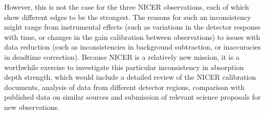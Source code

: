 		    However, this is not the case for the three NICER observations, each of which show different edges to be the strongest. The reasons for such an inconsistency might range from instrumental effects (such as variations in the detector response with time, or changes in the gain calibration between observations) to issues with data reduction (such as inconsistencies in background subtraction, or inaccuracies in deadtime correction). Because NICER is a relatively new mission, it is a worthwhile exercise to investigate this particular inconsistency in absorption depth strength, which would include a detailed review of the NICER calibration documents, analysis of data from different detector regions, comparison with published data on similar sources and submission of relevant science proposals for new observations.